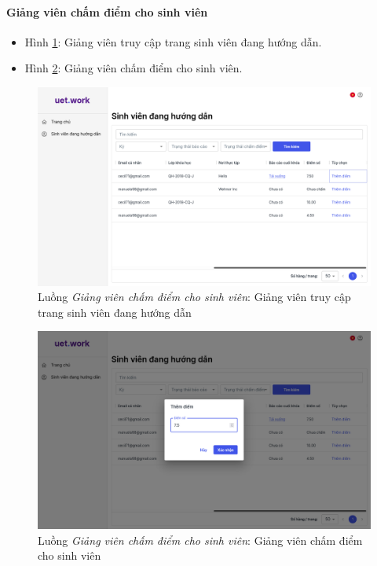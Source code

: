 \documentclass[./../main.tex]{subfiles}
\begin{document}
\paragraph*{Giảng viên chấm điểm cho sinh viên}

\begin{itemize}
	\item Hình \ref{fig:lecturer_access_students_page}: Giảng viên truy cập trang sinh viên đang hướng dẫn.
	\item Hình \ref{fig:lecturer_score}: Giảng viên chấm điểm cho sinh viên.
\end{itemize}

\begin{figure}[]
	\includegraphics[width=\linewidth]{./images/image64.png}
	\caption{Luồng \emph{Giảng viên chấm điểm cho sinh viên}: Giảng viên truy cập trang sinh viên đang hướng dẫn}
	\label{fig:lecturer_access_students_page}
\end{figure}

\begin{figure}[]
	\includegraphics[width=\linewidth]{./images/image65.png}
	\caption{Luồng \emph{Giảng viên chấm điểm cho sinh viên}: Giảng viên chấm điểm cho sinh viên}
	\label{fig:lecturer_score}
\end{figure}
\end{document}

